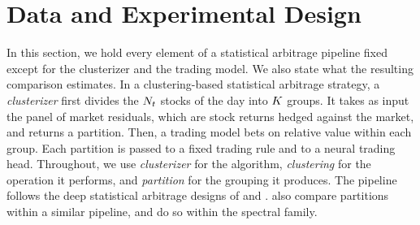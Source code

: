 \section{Data and Experimental Design}
\label{sec:design}

In this section, we hold every element of a statistical arbitrage
pipeline fixed except for the clusterizer and the trading model. We also state what the resulting comparison estimates. In a clustering-based statistical arbitrage strategy, a \emph{clusterizer} first divides the $N_t$ stocks of the day
into $K$ groups. It takes as input the panel of market residuals, which are stock returns hedged against the market, and returns a partition. Then, a trading model bets on relative value within each
group. Each partition is passed to a fixed trading rule and to a neural trading head. Throughout, we use \emph{clusterizer} for the algorithm, \emph{clustering} for the operation it performs, and \emph{partition} for the grouping it produces. The pipeline follows the deep statistical arbitrage designs of \citet{guijarro2025deep} and
\citet{epstein2025attention}. \citet{brutti2026orthogonal} also compare partitions within a similar pipeline, and \citet{Jinetal2023} do so within the spectral family.

